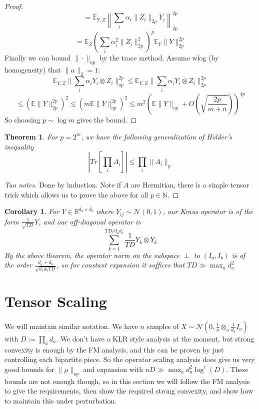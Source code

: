 \documentclass{article}
\newtheorem{theorem}{Theorem}
\newtheorem{corollary}{Corollary}
\newcommand{\R}{{\mathbb{R}}}
\newcommand{\E}{\mathbb{E}}
\begin{document}
\begin{proof}
\[ = \E_{Y,Z} \left\|\sum_{i} \alpha_{i} \|Z_{i}\|_{2p} Y_{i} \right\|_{2p}^{2p}   \]
\[ = \E_{Z} \left( \sum_{i} \alpha_{i}^{2} \|Z_{i}\|_{2p}^{2} \right)^{p} \E_{Y} \|Y\|_{2p}^{2p}    \]
Finally we can bound $\|\cdot\|_{op}$ by the trace method. Assume wlog (by homogeneity) that $\|\alpha\|_{2} = 1$:
\[ \E_{Y,Z} \|\sum_{i} \alpha_{i} Y_{i} \otimes Z_{i} \|_{op}^{2p} \leq \E_{Y,Z} \|\sum_{i} \alpha_{i} Y_{i} \otimes Z_{i} \|_{2p}^{2p} \]
\[ \leq ( \E \|Y\|_{2p}^{2p} )^{2} \leq ( m \E \|Y\|_{op}^{2p} )^{2} \leq m^{2} (\E \|Y\|_{op} + O(\sqrt{\frac{2p}{m+n}}))^{4p} \]
So choosing $p \sim \log m$ gives the bound. 
\end{proof}

\begin{theorem}
For $p = 2^{m}$, we have the following generalization of Holder's inequality
\[ |Tr[\prod_{i} A_{i}]| \leq \prod_{i} \|A_{i}\|_{p}   \]
\end{theorem}
\begin{proof} [Tao notes]
Done by induction. Note if $A$ are Hermitian, there is a simple tensor trick which allows us to prove the above for all $p \in \mathbb{N}$. 
\end{proof}

\begin{corollary}
For $Y \in \R^{d_{a} \times d_{b}}$ where $Y_{ij} \sim \mathcal{N}(0,1)$, our Kraus operator is of the form $\frac{1}{\sqrt{TD}} Y$, and our off-diagonal operator is
\[ \sum_{k=1}^{TD/d_{a}d_{b}} \frac{1}{TD} Y_{k} \otimes Y_{k}   \]
By the above theorem, the operator norm on the subspace $\perp$ to $(I_{a},I_{b})$ is of the order $\frac{d_{a}+d_{b}}{\sqrt{d_{a} d_{b} TD}}$, so for constant expansion it suffices that $TD \gg \max_{a} d_{a}^{2}$
\end{corollary}


\section{Tensor Scaling}
We will maintain similar notation. We have $n$ samples of $X \sim \mathcal{N}(0,\frac{1}{n} \otimes_{a} \frac{1}{d_{a}} I_{a})$ with $D := \prod_{a} d_{a}$. We don't have a KLR style analysis at the moment, but strong convexity is enough by the FM analysis, and this can be proven by just controlling each bipartite piece. So the operator scaling analysis does give us very good bounds for $\|\mu\|_{op}$ and expansion with $nD \gg \max_{a} d_{a}^{2} \log^{c}(D)$. These bounds are not enough though, so in this section we will follow the FM analysis to give the requirements, then show the required strong convexity, and show how to maintain this under perturbation. 
\end{document}
